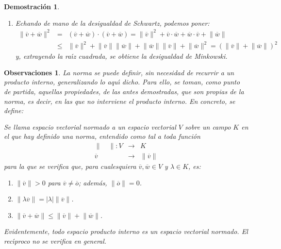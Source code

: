 \documentclass[a4paper,11pt]{article}
\theoremstyle{teoremas}
\theoremstyle{ejemplos}
\theoremstyle{definiciones}
\theoremstyle{lemas}
\newtheorem*{demostracion}{Demostraci\'on}
\newtheorem*{observaciones}{Observaciones}
\begin{document}
\begin{demostracion}
\begin{enumerate}
  \item Echando de mano de la desigualdad de Schwartz, podemos poner:
  \begin{eqnarray*}
   \lVert \overline{v} + \overline{w} \rVert^2
    & = & \left( \overline{v} + \overline{w} \right) \cdot \left( \overline{v} + \overline{w} \right) = \lVert \overline{v} \rVert^2 + \overline{v} \cdot \overline{w} + \overline{w} \cdot \overline{v} + \lVert \overline{w} \rVert \\ 
    & \leq & \lVert \overline{v} \rVert^2 + \lVert \overline{v} \rVert \lVert \overline{w} \rVert + \lVert \overline{w} \rVert \lVert \overline{v} \rVert + \lVert \overline{w} \rVert^2 = \left( \lVert \overline{v} \rVert + \lVert \overline{w} \rVert \right)^2
  \end{eqnarray*}
  y, extrayendo la ra\'{\i}z cuadrada, se obtiene la desigualdad de Minkowski.
 \end{enumerate}
\end{demostracion}

\begin{observaciones}
 La norma se puede definir, sin necesidad de recurrir a un producto interno, generalizando lo aqu\'{\i} dicho.
 Para ello, se toman, como punto de partida, aquellas propiedades, de las antes demostradas, que son propias de la norma, es decir, en las que no interviene el producto interno.
 En concreto, se define:
 \par 
 Se llama \textit{espacio vectorial normado} a un espacio vectorial $V$ sobre un campo $K$ en el que hay definido una \textit{norma}, entendido como tal a toda funci\'on
 \begin{eqnarray*}
  \lVert \quad \rVert: V & \rightarrow & K \\
            \overline{v} & \rightarrow & \lVert \overline{v} \rVert
 \end{eqnarray*}
 para la que se verifica que, para cualesquiera $\overline{v}, \overline{w} \in V$ y $\lambda \in K$, es:
 \begin{enumerate}
  \item $\lVert \overline{v} \rVert > 0$ para $\overline{v} \neq \overline{o}$; adem\'as, $\lVert \overline{o} \rVert = 0$.
  \item $\lVert \lambda \overline{v} \rVert = \lvert \lambda \rvert \lVert \overline{v} \rVert$.
  \item $\lVert \overline{v} + \overline{w} \rVert \leq \lVert \overline{v} \rVert + \lVert \overline{w} \rVert$.
 \end{enumerate}
 Evidentemente, todo espacio producto interno es un espacio vectorial normado. El rec\'{\i}proco no se verifica en general.
\end{observaciones}
\end{document}
